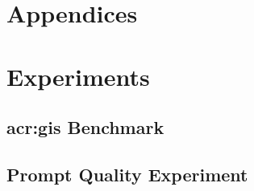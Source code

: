 \begin{appendix}
    \chapter*{Appendices}
    \label{cha:appendices}




    \chapter{Experiments}
    \label{app:experiments}

    \section[GIS Benchmark]{\acrshort{acr:gis} Benchmark}
    \label{appsec:questions-and-answer}

    
    \newpage
    

    \newpage

    \section{Prompt Quality Experiment}
    
    \newpage
    



\end{appendix}